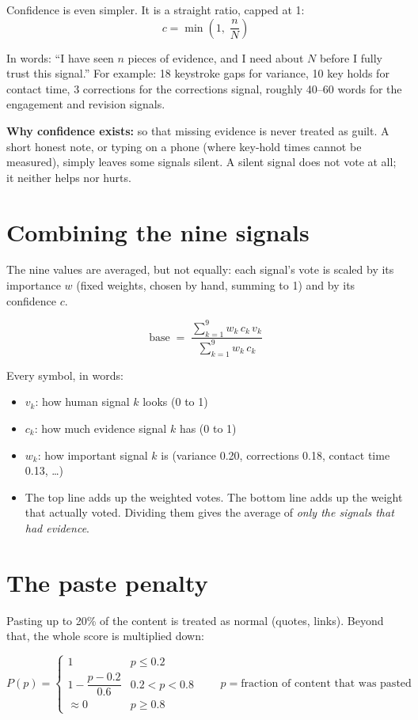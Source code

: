 \documentclass[11pt,a4paper]{article}
\begin{document}
Confidence is even simpler. It is a straight ratio, capped at 1:
\[
c = \min\!\left(1,\; \frac{n}{N}\right)
\]

In words: ``I have seen $n$ pieces of evidence, and I need about $N$ before I fully trust this signal.'' For example: 18 keystroke gaps for variance, 10 key holds for contact time, 3 corrections for the corrections signal, roughly 40--60 words for the engagement and revision signals.

\textbf{Why confidence exists:} so that missing evidence is never treated as guilt. A short honest note, or typing on a phone (where key-hold times cannot be measured), simply leaves some signals silent. A silent signal does not vote at all; it neither helps nor hurts.

\section{Combining the nine signals}

The nine values are averaged, but not equally: each signal's vote is scaled by its importance $w$ (fixed weights, chosen by hand, summing to 1) and by its confidence $c$.

\[
\text{base} \;=\; \frac{\sum_{k=1}^{9} w_k \, c_k \, v_k}{\sum_{k=1}^{9} w_k \, c_k}
\]

Every symbol, in words:
\begin{itemize}
  \item $v_k$: how human signal $k$ looks (0 to 1)
  \item $c_k$: how much evidence signal $k$ has (0 to 1)
  \item $w_k$: how important signal $k$ is (variance 0.20, corrections 0.18, contact time 0.13, \dots)
  \item The top line adds up the weighted votes. The bottom line adds up the weight that actually voted. Dividing them gives the average of \emph{only the signals that had evidence}.
\end{itemize}

\section{The paste penalty}

Pasting up to 20\% of the content is treated as normal (quotes, links). Beyond that, the whole score is multiplied down:

\[
P(p) =
\begin{cases}
1 & p \le 0.2 \\[2pt]
1 - \dfrac{p - 0.2}{0.6} & 0.2 < p < 0.8 \\[6pt]
\approx 0 & p \ge 0.8
\end{cases}
\qquad p = \text{fraction of content that was pasted}
\]
\end{document}
